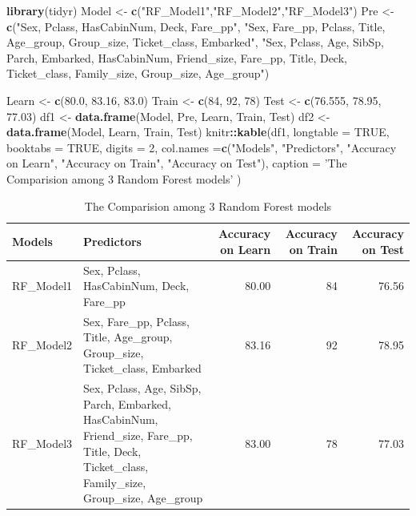 \documentclass[
]{book}
\newenvironment{Shaded}{\begin{snugshade}}{\end{snugshade}}
\newcommand{\DataTypeTok}[1]{\textcolor[rgb]{0.13,0.29,0.53}{#1}}
\newcommand{\DecValTok}[1]{\textcolor[rgb]{0.00,0.00,0.81}{#1}}
\newcommand{\FloatTok}[1]{\textcolor[rgb]{0.00,0.00,0.81}{#1}}
\newcommand{\KeywordTok}[1]{\textcolor[rgb]{0.13,0.29,0.53}{\textbf{#1}}}
\newcommand{\NormalTok}[1]{#1}
\newcommand{\OperatorTok}[1]{\textcolor[rgb]{0.81,0.36,0.00}{\textbf{#1}}}
\newcommand{\OtherTok}[1]{\textcolor[rgb]{0.56,0.35,0.01}{#1}}
\newcommand{\StringTok}[1]{\textcolor[rgb]{0.31,0.60,0.02}{#1}}
\begin{document}
\begin{Shaded}
\begin{Highlighting}[]
\KeywordTok{library}\NormalTok{(tidyr)}
\NormalTok{Model <-}\StringTok{ }\KeywordTok{c}\NormalTok{(}\StringTok{"RF_Model1"}\NormalTok{,}\StringTok{"RF_Model2"}\NormalTok{,}\StringTok{"RF_Model3"}\NormalTok{)}
\NormalTok{Pre <-}\StringTok{ }\KeywordTok{c}\NormalTok{(}\StringTok{"Sex, Pclass, HasCabinNum, Deck, Fare_pp"}\NormalTok{, }\StringTok{"Sex, Fare_pp, Pclass, Title, Age_group, Group_size, Ticket_class, Embarked"}\NormalTok{, }\StringTok{"Sex, Pclass, Age, SibSp, Parch, Embarked, HasCabinNum, Friend_size, Fare_pp, Title, Deck, Ticket_class, Family_size, Group_size, Age_group"}\NormalTok{)}

\NormalTok{Learn <-}\StringTok{ }\KeywordTok{c}\NormalTok{(}\FloatTok{80.0}\NormalTok{, }\FloatTok{83.16}\NormalTok{, }\FloatTok{83.0}\NormalTok{)}
\NormalTok{Train <-}\StringTok{ }\KeywordTok{c}\NormalTok{(}\DecValTok{84}\NormalTok{, }\DecValTok{92}\NormalTok{, }\DecValTok{78}\NormalTok{)}
\NormalTok{Test <-}\StringTok{ }\KeywordTok{c}\NormalTok{(}\FloatTok{76.555}\NormalTok{, }\FloatTok{78.95}\NormalTok{, }\FloatTok{77.03}\NormalTok{)}
\NormalTok{df1 <-}\StringTok{ }\KeywordTok{data.frame}\NormalTok{(Model, Pre, Learn, Train, Test)}
\NormalTok{df2 <-}\StringTok{ }\KeywordTok{data.frame}\NormalTok{(Model, Learn, Train, Test)}
\NormalTok{knitr}\OperatorTok{::}\KeywordTok{kable}\NormalTok{(df1, }\DataTypeTok{longtable =} \OtherTok{TRUE}\NormalTok{, }\DataTypeTok{booktabs =} \OtherTok{TRUE}\NormalTok{, }\DataTypeTok{digits =} \DecValTok{2}\NormalTok{, }\DataTypeTok{col.names =}\KeywordTok{c}\NormalTok{(}\StringTok{"Models"}\NormalTok{, }\StringTok{"Predictors"}\NormalTok{, }\StringTok{"Accuracy on Learn"}\NormalTok{, }\StringTok{"Accuracy on Train"}\NormalTok{, }\StringTok{"Accuracy on Test"}\NormalTok{), }
  \DataTypeTok{caption =} \StringTok{'The Comparision among 3 Random Forest models'}
\NormalTok{)}
\end{Highlighting}
\end{Shaded}

\begin{longtable}[t]{llrrr}
\caption{\label{tab:RFmodelscomp}The Comparision among 3 Random Forest models}\\
\toprule
Models & Predictors & Accuracy on Learn & Accuracy on Train & Accuracy on Test\\
\midrule
RF\_Model1 & Sex, Pclass, HasCabinNum, Deck, Fare\_pp & 80.00 & 84 & 76.56\\
RF\_Model2 & Sex, Fare\_pp, Pclass, Title, Age\_group, Group\_size, Ticket\_class, Embarked & 83.16 & 92 & 78.95\\
RF\_Model3 & Sex, Pclass, Age, SibSp, Parch, Embarked, HasCabinNum, Friend\_size, Fare\_pp, Title, Deck, Ticket\_class, Family\_size, Group\_size, Age\_group & 83.00 & 78 & 77.03\\
\bottomrule
\end{longtable}
\end{document}
